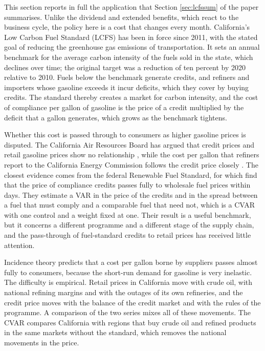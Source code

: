 \documentclass[12pt,a4paper]{article}
\theoremstyle{definition}
\begin{document}
This section reports in full the application that Section \ref{sec:lcfssum} of the paper summarises. Unlike the dividend and extended benefits, which react to the business cycle, the policy here is a cost that changes every month. California's Low Carbon Fuel Standard (LCFS) has been in force since 2011, with the stated goal of reducing the greenhouse gas emissions of transportation. It sets an annual benchmark for the average carbon intensity of the fuels sold in the state, which declines over time; the original target was a reduction of ten percent by 2020 relative to 2010. Fuels below the benchmark generate credits, and refiners and importers whose gasoline exceeds it incur deficits, which they cover by buying credits. The standard thereby creates a market for carbon intensity, and the cost of compliance per gallon of gasoline is the price of a credit multiplied by the deficit that a gallon generates, which grows as the benchmark tightens.

Whether this cost is passed through to consumers as higher gasoline prices is disputed. The California Air Resources Board has argued that credit prices and retail gasoline prices show no relationship \citep{CARB2024}, while the cost per gallon that refiners report to the California Energy Commission follows the credit price closely \citep{KleinmanCenter2024}. The closest evidence comes from the federal Renewable Fuel Standard, for which \citet{KnittelMeiselmanStock2017} find that the price of compliance credits passes fully to wholesale fuel prices within days. They estimate a VAR in the price of the credits and in the spread between a fuel that must comply and a comparable fuel that need not, which is a CVAR with one control and a weight fixed at one. Their result is a useful benchmark, but it concerns a different programme and a different stage of the supply chain, and the pass-through of fuel-standard credits to retail prices has received little attention.

Incidence theory predicts that a cost per gallon borne by suppliers passes almost fully to consumers, because the short-run demand for gasoline is very inelastic. The difficulty is empirical. Retail prices in California move with crude oil, with national refining margins and with the outages of its own refineries, and the credit price moves with the balance of the credit market and with the rules of the programme. A comparison of the two series mixes all of these movements. The CVAR compares California with regions that buy crude oil and refined products in the same markets without the standard, which removes the national movements in the price.
\end{document}
